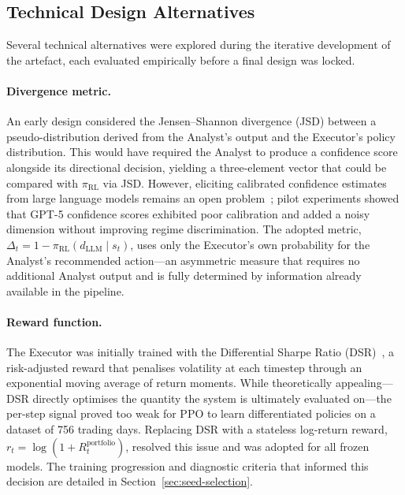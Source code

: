 \subsection{Technical Design Alternatives}
\label{sec:technical-alternatives}

Several technical alternatives were explored during the iterative development of the artefact, each evaluated empirically before a final design was locked.

\paragraph{Divergence metric.}
An early design considered the Jensen--Shannon divergence (JSD) between a pseudo-distribution derived from the Analyst's output and the Executor's policy distribution. This would have required the Analyst to produce a confidence score alongside its directional decision, yielding a three-element vector that could be compared with $\pi_{\mathrm{RL}}$ via JSD. However, eliciting calibrated confidence estimates from large language models remains an open problem~\citep{kadavath2022language}; pilot experiments showed that GPT-5 confidence scores exhibited poor calibration and added a noisy dimension without improving regime discrimination. The adopted metric, $\Delta_t = 1 - \pi_{\mathrm{RL}}(d_{\mathrm{LLM}} \mid s_t)$, uses only the Executor's own probability for the Analyst's recommended action---an asymmetric measure that requires no additional Analyst output and is fully determined by information already available in the pipeline.

\paragraph{Reward function.}
The Executor was initially trained with the Differential Sharpe Ratio (DSR)~\cite{moody2001learning}, a risk-adjusted reward that penalises volatility at each timestep through an exponential moving average of return moments. While theoretically appealing---DSR directly optimises the quantity the system is ultimately evaluated on---the per-step signal proved too weak for PPO to learn differentiated policies on a dataset of 756 trading days. Replacing DSR with a stateless log-return reward, $r_t = \log(1 + R_t^{\mathrm{portfolio}})$, resolved this issue and was adopted for all frozen models. The training progression and diagnostic criteria that informed this decision are detailed in Section~\ref{sec:seed-selection}.


